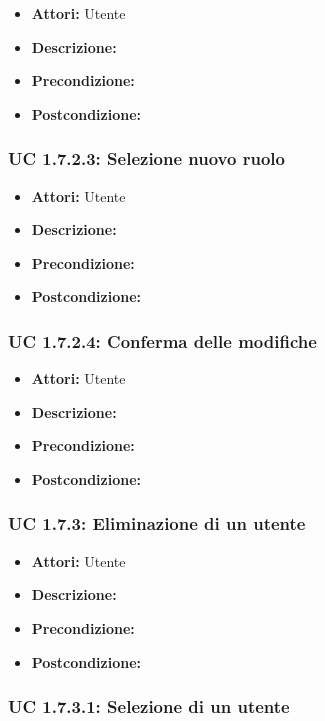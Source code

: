\begin{itemize}
\item \textbf{Attori:} Utente
\item \textbf{Descrizione:} 
\item \textbf{Precondizione:} 
\item \textbf{Postcondizione:} 
\end{itemize}

\subsubsection{UC 1.7.2.3: Selezione nuovo ruolo}

\begin{itemize}
\item \textbf{Attori:} Utente
\item \textbf{Descrizione:} 
\item \textbf{Precondizione:} 
\item \textbf{Postcondizione:} 
\end{itemize}

\subsubsection{UC 1.7.2.4: Conferma delle modifiche}

\begin{itemize}
\item \textbf{Attori:} Utente
\item \textbf{Descrizione:} 
\item \textbf{Precondizione:} 
\item \textbf{Postcondizione:} 
\end{itemize}

\subsubsection{UC 1.7.3: Eliminazione di un utente}

\begin{itemize}
\item \textbf{Attori:} Utente
\item \textbf{Descrizione:} 
\item \textbf{Precondizione:} 
\item \textbf{Postcondizione:} 
\end{itemize}

\subsubsection{UC 1.7.3.1: Selezione di un utente}


